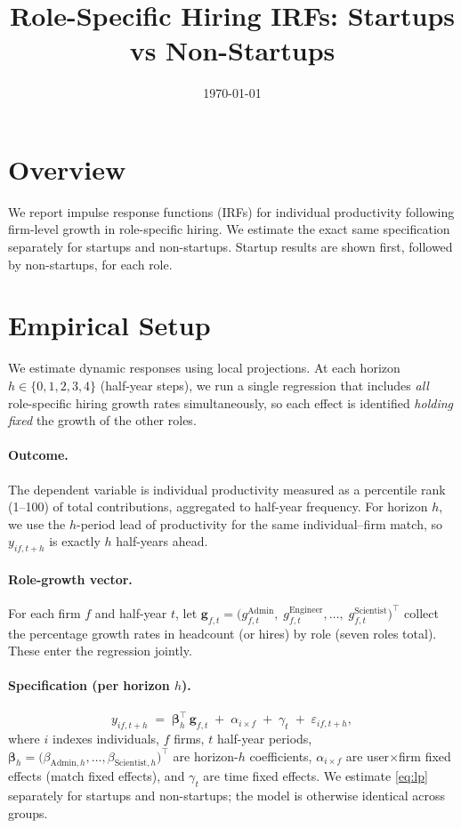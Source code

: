 \documentclass[11pt]{article}
\title{Role-Specific Hiring IRFs: Startups vs Non-Startups}
\author{}
\date{\today}
\begin{document}
\maketitle

\section*{Overview}
We report impulse response functions (IRFs) for individual productivity following firm-level growth in role-specific hiring. We estimate the exact same specification separately for startups and non-startups. Startup results are shown first, followed by non-startups, for each role.

\section*{Empirical Setup}
We estimate dynamic responses using local projections. At each horizon $h\in\{0,1,2,3,4\}$ (half-year steps), we run a single regression that includes \emph{all} role-specific hiring growth rates simultaneously, so each effect is identified \emph{holding fixed} the growth of the other roles.

\paragraph{Outcome.} The dependent variable is individual productivity measured as a percentile rank (1--100) of total contributions, aggregated to half-year frequency. For horizon $h$, we use the $h$-period lead of productivity for the same individual--firm match, so $y_{if,t+h}$ is exactly $h$ half-years ahead.

\paragraph{Role-growth vector.} For each firm $f$ and half-year $t$, let $\bm g_{f,t} = \big(g_{f,t}^{\text{Admin}},\; g_{f,t}^{\text{Engineer}},\ldots,\; g_{f,t}^{\text{Scientist}}\big)^{\top}$ collect the percentage growth rates in headcount (or hires) by role (seven roles total). These enter the regression jointly.

\paragraph{Specification (per horizon $h$).}
\begin{equation}
\label{eq:lp}
 y_{if,t+h} \;=\; \bm\beta_h^{\top}\,\bm g_{f,t} \; + \; \alpha_{i\times f} \; + \; \gamma_t \; + \; \varepsilon_{if,t+h},
\end{equation}
where $i$ indexes individuals, $f$ firms, $t$ half-year periods, $\bm\beta_h = \big(\beta_{\text{Admin},h},\ldots,\beta_{\text{Scientist},h}\big)^{\top}$ are horizon-$h$ coefficients, $\alpha_{i\times f}$ are user$\times$firm fixed effects (match fixed effects), and $\gamma_t$ are time fixed effects. We estimate \eqref{eq:lp} separately for startups and non-startups; the model is otherwise identical across groups.
\end{document}
